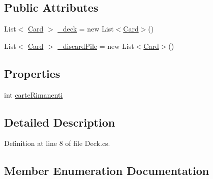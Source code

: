 \subsection*{Public Attributes}
\begin{DoxyCompactItemize}
\item 
List$<$ \hyperlink{class_fontanella_1_1_simone_1_1__5i_1_1_briscola_1_1_card}{Card} $>$ \hyperlink{class_fontanella_1_1_simone_1_1__5i_1_1_briscola_1_1_deck_a5dc9a572ca0d289f9726513ecdaf5203}{\+\_\+deck} = new List$<$\hyperlink{class_fontanella_1_1_simone_1_1__5i_1_1_briscola_1_1_card}{Card}$>$()
\item 
List$<$ \hyperlink{class_fontanella_1_1_simone_1_1__5i_1_1_briscola_1_1_card}{Card} $>$ \hyperlink{class_fontanella_1_1_simone_1_1__5i_1_1_briscola_1_1_deck_a065f7dd81106ac0d3856034059a02977}{\+\_\+discard\+Pile} = new List$<$\hyperlink{class_fontanella_1_1_simone_1_1__5i_1_1_briscola_1_1_card}{Card}$>$()
\end{DoxyCompactItemize}
\subsection*{Properties}
\begin{DoxyCompactItemize}
\item 
int \hyperlink{class_fontanella_1_1_simone_1_1__5i_1_1_briscola_1_1_deck_aa18c1840ad50ac7c015b5bcc34c1892f}{carte\+Rimanenti}
\end{DoxyCompactItemize}


\subsection{Detailed Description}


Definition at line 8 of file Deck.\+cs.



\subsection{Member Enumeration Documentation}
\hypertarget{class_fontanella_1_1_simone_1_1__5i_1_1_briscola_1_1_deck_a7f82994e5bc71f3c6ab33157e02554ea}{}\label{class_fontanella_1_1_simone_1_1__5i_1_1_briscola_1_1_deck_a7f82994e5bc71f3c6ab33157e02554ea} 
